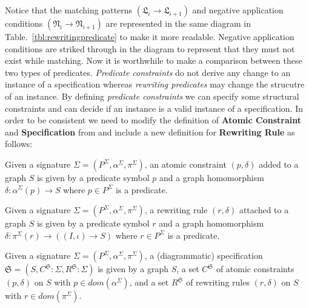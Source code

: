 \documentclass{eceasst}
\begin{document}
Notice that the matching patterns $(\mathfrak{L}_i \rightarrow \mathfrak{L}_{i+1})$ and negative application conditions $(\mathfrak{N}_i \rightarrow \mathfrak{N}_{i+1}) $ 
are represented in the same diagram in 
Table.~\ref{tbl:rewritingpredicate} to make it more readable. Negative application conditions are striked through in the diagram to represent that they must not exist while matching. 
Now it is worthwhile to make a comparison between these two types of predicates. 
\textit{Predicate constraints} do not derive any change to an instance of a specification whereas \textit{rewriting predicates} may change the strucutre of an instance. 
By defining \textit{predicate constraints} we can specify some structural constraints and can decide if an instance is a valid instance of a specification. 
In order to be consistent we need to modify the definition of \textbf{Atomic Constraint} and \textbf{Specification} from \cite{Rutle10} and include a new definition for \textbf{Rewriting Rule} as follows:


\begin{definition}
 Given a signature $\Sigma = (P^\Sigma, \alpha^\Sigma, \pi^\Sigma)$, an atomic constraint $(p, \delta)$ added to a graph $S$ is given by a predicate symbol $p$ and a graph 
 homomorphism $\delta : \alpha^{\Sigma}(p) \rightarrow S$ where $p \in P^\Sigma$ is a predicate. 
\end{definition}



\begin{definition}
 Given a signature $\Sigma = (P^\Sigma, \alpha^\Sigma, \pi^\Sigma)$, a rewriting rule $(r, \delta)$ attached to a graph $S$ is given by a predicate symbol $r$ and a graph 
 homomorphism $\delta : \pi^{\Sigma}(r) \rightarrow ((I, \iota) \rightarrow S)$ where $r \in P^\Sigma$ is a predicate. 
\end{definition}


\begin{definition}[Specification]
 Given a signature $\Sigma = (P^\Sigma, \alpha^\Sigma, \pi^\Sigma)$, a (diagrammatic) specification $\mathfrak{S} = (S, C^{\mathfrak{S}}:\Sigma, R^{\mathfrak{S}}:\Sigma )$ 
 is given by 
 a graph $S$, 
 a set $C^\mathfrak{S}$ of atomic constraints $(p, \delta)$ on $S$ with $p \in dom(\alpha^\Sigma)$, and
 a set $R^\mathfrak{S}$ of rewriting rules $(r, \delta)$ on $S$ with $r \in dom(\pi^\Sigma)$. 

\end{definition}
\end{document}
